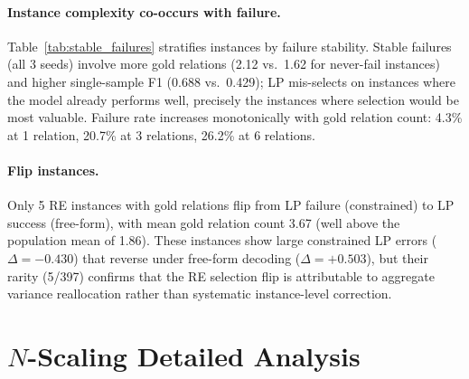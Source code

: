 \paragraph{Instance complexity co-occurs with failure.}
Table~\ref{tab:stable_failures} stratifies instances by failure stability.
Stable failures (all 3 seeds) involve more gold relations (2.12 vs.\ 1.62 for never-fail instances) and higher single-sample F1 (0.688 vs.\ 0.429); LP mis-selects on instances where the model already performs well, precisely the instances where selection would be most valuable.
Failure rate increases monotonically with gold relation count: 4.3\% at 1 relation, 20.7\% at 3 relations, 26.2\% at 6 relations.

\begin{table}[t]
\centering
\small
\caption{RE LP selection failure stability across 3 seeds (SciERC, $N{=}8$). Stable failures concentrate on relation-dense instances with high single-sample F1.}
\label{tab:stable_failures}
\end{table}

\paragraph{Flip instances.}
Only 5 RE instances with gold relations flip from LP failure (constrained) to LP success (free-form), with mean gold relation count 3.67 (well above the population mean of 1.86).
These instances show large constrained LP errors ($\Delta{=}{-}0.430$) that reverse under free-form decoding ($\Delta{=}{+}0.503$), but their rarity (5/397) confirms that the RE selection flip is attributable to aggregate variance reallocation rather than systematic instance-level correction.

\section{$N$-Scaling Detailed Analysis}\label{app:n_scaling}

